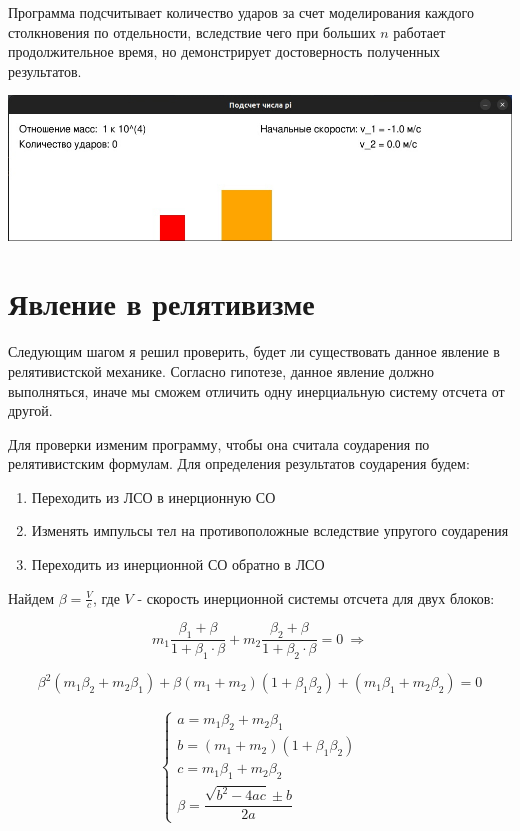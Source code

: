 \documentclass[a4paper,12pt]{article} %
\begin{document}
Программа подсчитывает количество ударов за счет моделирования каждого столкновения по отдельности, вследствие чего при больших $n$ работает продолжительное время, но демонстрирует достоверность полученных результатов.

\begin{center}
    \includegraphics[width=0.7\linewidth]{ProgPic.jpg}
\end{center}

\newpage


\section*{Явление в релятивизме}
Следующим шагом я решил проверить, будет ли существовать данное явление в релятивистской механике. Согласно гипотезе, данное явление должно выполняться, иначе мы сможем отличить одну инерциальную систему отсчета от другой.

Для проверки изменим программу, чтобы она считала соударения по релятивистским формулам. Для определения результатов соударения будем:
\begin{enumerate}
    \item Переходить из ЛСО в инерционную СО
    \item Изменять импульсы тел на противоположные вследствие упругого соударения
    \item Переходить из инерционной СО обратно в ЛСО
\end{enumerate}

\bigskip

Найдем $\beta = \frac{V}{c}$, где $V$ - скорость инерционной системы отсчета для двух блоков: 

\[
m_1\frac{\beta_1 + \beta}{1 + \beta_1 \cdot \beta} + m_2\frac{\beta_2 + \beta}{1 + \beta_2 \cdot \beta} = 0 \ \Rightarrow
\]

\[
\beta^2(m_1\beta_2 + m_2\beta_1) + \beta(m_1 + m_2)(1 + \beta_1\beta_2) + (m_1\beta_1 + m_2\beta_2) = 0
\]

\[
\begin{matrix}
    \left\{
    \begin{matrix}
        a = m_1\beta_2 + m_2\beta_1 \\
        b = (m_1 + m_2)(1 + \beta_1\beta_2) \\
        c = m_1\beta_1 + m_2\beta_2 \\
        \beta = \dfrac{\sqrt{b^2 - 4ac} \pm b}{2a}
    \end{matrix}
\end{matrix}
\]
\end{document}
